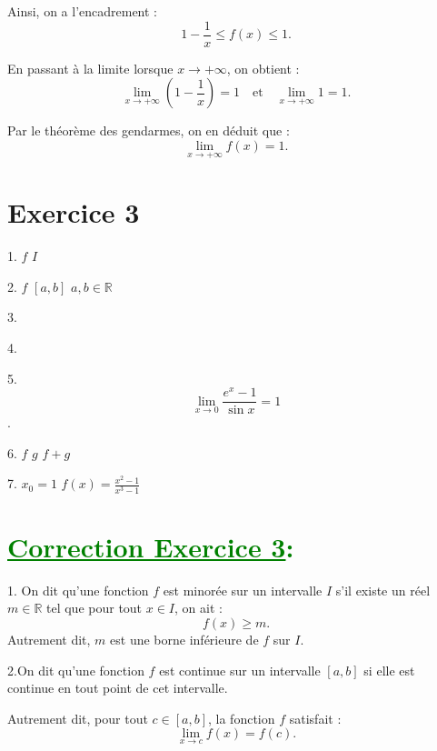 \documentclass[12pt]{article}
\begin{document}
Ainsi, on a l'encadrement :
\[
1 - \frac{1}{x} \leq f(x) \leq 1.
\]

En passant à la limite lorsque \(x \to +\infty\), on obtient :
\[
\lim_{x \to +\infty} \left( 1 - \frac{1}{x} \right) = 1 \quad \text{et} \quad \lim_{x \to +\infty} 1 = 1.
\]

Par le théorème des gendarmes, on en déduit que :
\[
\lim_{x \to +\infty} f(x) = 1.
\]

\section*{Exercice 3}

1.  \( f \)  \( I \)

2.  \( f \)  \([a, b]\)  \(a, b \in \mathbb{R}\) 

3. 

4. 

5.  \[ \lim_{{x \to 0}} \frac{e^{x}-1}{\sin x} = 1 \].

6.  \( f \)  \( g \)  \( f + g \)\\ 

7. \( x_0 = 1\)  \(f(x) = \frac{x^2 - 1}{x^3 - 1}\)
\section*{\textcolor{green}{\underline{Correction Exercice 3}:}}
1. On dit qu'une fonction \( f \) est minorée sur un intervalle \( I \) s'il existe un réel \( m \in \mathbb{R} \) tel que pour tout \( x \in I \), on ait :
\[
f(x) \geq m.
\]
Autrement dit, \( m \) est une borne inférieure de \( f \) sur \( I \).


2.On dit qu'une fonction \( f \) est continue sur un intervalle \([a, b]\) si elle est continue en tout point de cet intervalle.

Autrement dit, pour tout \( c \in [a, b] \), la fonction \( f \) satisfait :
\[
\lim_{x \to c} f(x) = f(c).
\]
\end{document}
